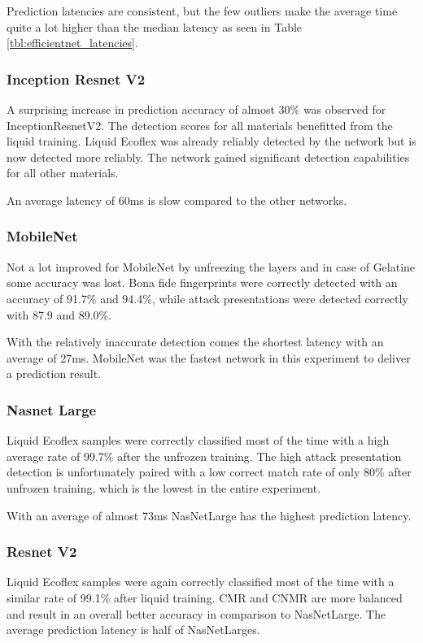 Prediction latencies are consistent, but the few outliers make the average time quite a lot higher than the median latency as seen in Table \ref{tbl:efficientnet_latencies}.



\subsubsection{Inception Resnet V2}
A surprising increase in prediction accuracy of almost 30\% was observed for InceptionResnetV2.
The detection scores for all materials benefitted from the liquid training.
Liquid Ecoflex was already reliably detected by the network but is now detected more reliably.
The network gained significant detection capabilities for all other materials.

An average latency of 60ms is slow compared to the other networks.



\subsubsection{MobileNet}
Not a lot improved for MobileNet by unfreezing the layers and in case of Gelatine some accuracy was lost.
Bona fide fingerprints were correctly detected with an accuracy of 91.7\% and 94.4\%, while attack presentations were detected correctly with 87.9 and 89.0\%.

With the relatively inaccurate detection comes the shortest latency with an average of 27ms.
MobileNet was the fastest network in this experiment to deliver a prediction result.



\subsubsection{Nasnet Large}
Liquid Ecoflex samples were correctly classified most of the time with a high average rate of 99.7\% after the unfrozen training.
The high attack presentation detection is unfortunately paired with a low correct match rate of only 80\% after unfrozen training, which is the lowest in the entire experiment.

With an average of almost 73ms NasNetLarge has the highest prediction latency.



\subsubsection{Resnet V2}
Liquid Ecoflex samples were again correctly classified most of the time with a similar rate of 99.1\% after liquid training.
CMR and CNMR are more balanced and result in an overall better accuracy in comparison to NasNetLarge.
The average prediction latency is half of NasNetLarges.

